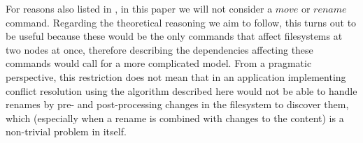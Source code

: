 \medskip


For reasons also listed in \cite{NREC}, in this paper we will not consider
a $move$ or $rename$ command. Regarding the theoretical reasoning we aim to follow,
this turns out to be useful because these would be the only commands that affect
filesystems at two nodes at once, therefore describing 
the dependencies affecting these commands
would call for a more complicated model.
From a pragmatic perspective, this restriction does not mean that in an application
implementing conflict resolution using the algorithm described here would not be
able to handle renames by pre- and post-processing changes in the filesystem to
discover them, which (especially when a rename is combined with changes to the content)
is a non-trivial problem in itself.
